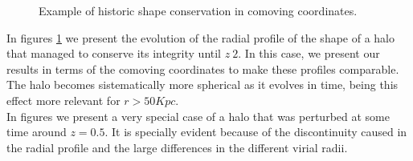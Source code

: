 \begin{figure}[!ht]
  \centering
  \hfill
  \caption{Example of historic shape conservation in comoving coordinates.}
  \label{fig:RedshiftGood}
\end{figure}

In figures \ref{fig:RedshiftGood} we present the evolution of the radial profile of the shape of a halo that managed to conserve its integrity until $z~2$. In this case, we present our results in terms of the comoving coordinates to make these profiles comparable. The halo becomes sistematically more spherical as it evolves in time, being this effect more relevant for $r>50Kpc$.\\

In figures \label{fig:RedshiftDMbad} we present a very special case of a halo that was perturbed at some time around $z=0.5$. It is specially evident because of the discontinuity caused in the radial profile and the large differences in the different virial radii. \\  


